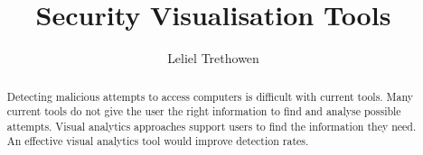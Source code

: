 \documentclass[11pt, a4paper, twoside, openright]{report}
\title{Security Visualisation Tools}
\author{Leliel Trethowen}
\date{}
\begin{document}
\frontmatter



\begin{abstract}

Detecting malicious attempts to access computers is difficult with current tools. Many current tools do not give the user the right information to find and analyse possible attempts. Visual analytics approaches support users to find the information they need. An effective visual analytics tool would improve detection rates.

\end{abstract}


\maketitle

%

\tableofcontents



\mainmatter












\backmatter



%


\end{document}
